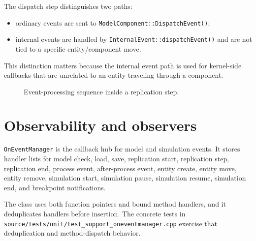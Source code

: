 The dispatch step distinguishes two paths:
\begin{itemize}
\item ordinary events are sent to \texttt{ModelComponent::DispatchEvent()};
\item internal events are handled by \texttt{InternalEvent::dispatchEvent()} and
are not tied to a specific entity/component move.
\end{itemize}

This distinction matters because the internal event path is used for kernel-side
callbacks that are unrelated to an entity traveling through a component.

\begin{figure}[htbp]
\centering
\caption{Event-processing sequence inside a replication step.}
\label{fig:event-scheduling-sequence}
\end{figure}

\section{Observability and observers}
\label{sec:event-scheduling-observers}

\texttt{OnEventManager} is the callback hub for model and simulation events. It
stores handler lists for model check, load, save, replication start, replication
step, replication end, process event, after-process event, entity create, entity
move, entity remove, simulation start, simulation pause, simulation resume,
simulation end, and breakpoint notifications.

The class uses both function pointers and bound method handlers, and it
deduplicates handlers before insertion. The concrete tests in
\texttt{source/tests/unit/test\_support\_oneventmanager.cpp} exercise that
deduplication and method-dispatch behavior.

